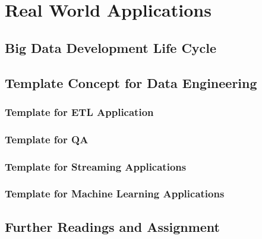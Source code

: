 \section{Real World Applications}
\subsection{Big Data Development Life Cycle}
\subsection{Template Concept for Data Engineering}
\subsubsection{Template for ETL Application}
\subsubsection{Template for QA}
\subsubsection{Template for Streaming Applications}
\subsubsection{Template for Machine Learning Applications}
\subsection{Further Readings and Assignment}

